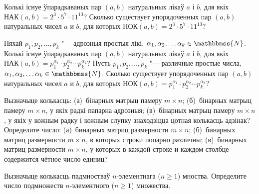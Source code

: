 \documentclass[12pt, a4paper]{article}
\begin{document}
\begin{problemList}
\problemItemSimple
{Колькі існуе ўпарадкаваных пар $(a,b)$ натуральных лікаў $a$ і $b$, для якіх $\text{НАК}(a,b) = 2^{3} \cdot 5^{7}\cdot 11^{13}$?}
{Сколько существует упорядоченных пар $(a,b)$ натуральных чисел $a$ и $b$, для которых $\text{НОК}(a,b) = 2^{3} \cdot 5^{7}\cdot 11^{13}$?}

\bigskip

\problemItemSimple
{Няхай $p_{1}, p_{2}, \dots, p_{k}$ "--- адрозныя простыя лікі, $\alpha_{1}, \alpha_{2}, \dots \alpha_{k} \in \mathbbmss{N}$. Колькі існуе ўпарадкаваных пар $(a,b)$  натуральных лікаў $a$ і $b$, для якіх $\text{НАК}(a,b) = p_{1} ^{\alpha_{1}} \cdot p_{2} ^{\alpha_{2}} \cdots p_{k} ^{\alpha_{k}}$?}
{Пусть $p_{1}, p_{2}, \dots, p_{k}$ "--- различные простые числа, $\alpha_{1}, \alpha_{2}, \dots \alpha_{k} \in \mathbbmss{N}$. Сколько существует упорядоченных пар $(a,b)$ натуральных чисел $a$ и $b$, для которых $\text{НОК}(a,b) = p_{1} ^{\alpha_{1}} \cdot p_{2} ^{\alpha_{2}} \cdots p_{k} ^{\alpha_{k}}$?}

\bigskip

\problemItemSimple
{Вызначыце колькасць: (а)~бінарных матрыц памеру $m \times n$; (б)~бінарных матрыц памеру $m \times n$, у якіх радкі папарна адрозныя; (в)~бінарных матрыц памеру $m \times n$, у якіх у кожным радку і кожным слупку знаходзіцца цотная колькасць адзінак?}
{Определите число: (а)~бинарных матриц размерности $m \times n$; (б)~бинарных матриц размерности $m \times n$, в которых строки попарно различны; (в)~бинарных матриц размерности $m \times n$, у которых в каждой строке и каждом столбце содержится чётное число единиц?}

\bigskip

\problemItemSimple
{Вызначыце колькасць падмностваў $n$-элементнага ($n \ge 1$) мноства.}
{Определите число подмножеств $n$-элементного ($n \ge 1$) множества.}

\end{problemList}
\end{document}
